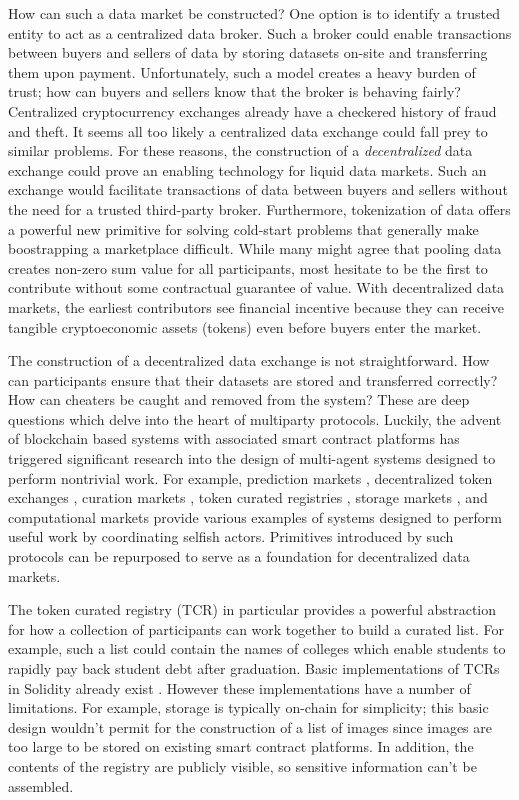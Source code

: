 \documentclass{llncs}
\begin{document}
How can such a data market be constructed? One option is to identify a trusted entity to act as a centralized data broker. Such a broker could enable transactions between buyers and sellers of data by storing datasets on-site and transferring them upon payment. Unfortunately, such a model creates a heavy burden of trust; how can buyers and sellers know that the broker is behaving fairly? Centralized cryptocurrency exchanges already have a checkered history of fraud and theft. It seems all too likely a centralized data exchange could fall prey to similar problems. For these reasons, the construction of a \textit{decentralized} data exchange could prove an enabling technology for liquid data markets. Such an exchange would facilitate transactions of data between buyers and sellers without the need for a trusted third-party broker. Furthermore, tokenization of data offers a powerful new primitive for solving cold-start problems that generally make boostrapping a marketplace difficult. While many might agree that pooling data creates non-zero sum value for all participants, most hesitate to be the first to contribute without some contractual guarantee of value. With decentralized data markets, the earliest contributors see financial incentive because they can receive tangible cryptoeconomic assets (tokens) even before buyers enter the market.

The construction of a decentralized data exchange is not straightforward. How can participants ensure that their datasets are stored and transferred correctly? How can cheaters be caught and removed from the system? These are deep questions which delve into the heart of multiparty protocols. Luckily, the advent of blockchain based systems with associated smart contract platforms \cite{buterin2013ethereum} has triggered significant research into the design of multi-agent systems designed to perform nontrivial work. For example, prediction markets \cite{peterson2015augur}, decentralized token exchanges \cite{warren20170x}, curation markets \cite{delarouviere2017curationmarkets}, token curated registries \cite{goldin2017tcr}, storage markets \cite{wilkinson2014storj}, and computational markets \cite{teutsch2017scalable} provide various examples of systems designed to perform useful work by coordinating selfish actors. Primitives introduced by such protocols can be repurposed to serve as a foundation for decentralized data markets.

The token curated registry (TCR) \cite{goldin2017tcr} in particular provides a powerful abstraction for how a collection of participants can work together to build a curated list. For example, such a list could contain the names of colleges which enable students to rapidly pay back student debt after graduation. Basic implementations of TCRs in Solidity already exist \cite{goldinTcrImpl}. However these implementations have a number of limitations. For example, storage is typically on-chain for simplicity; this basic design wouldn't permit for the construction of a list of images since images are too large to be stored on existing smart contract platforms. In addition, the contents of the registry are publicly visible, so sensitive information can't be assembled. 
\end{document}

